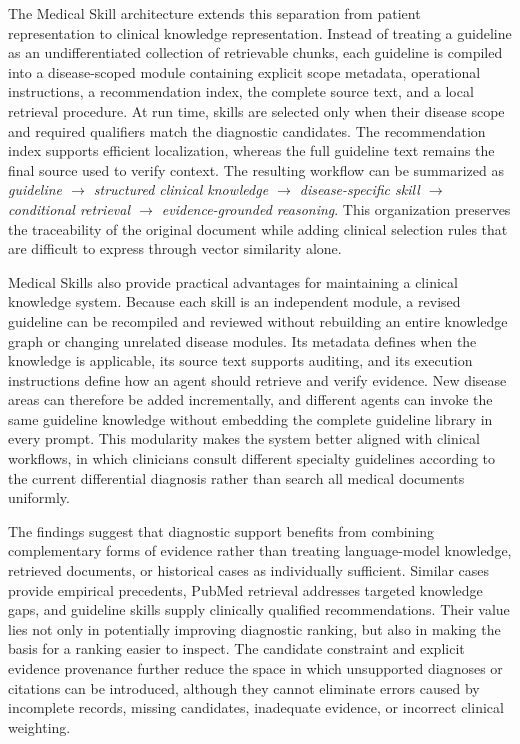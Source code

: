 \documentclass[10pt,letterpaper]{article}
\begin{document}
The Medical Skill architecture extends this separation from patient
representation to clinical knowledge representation. Instead of treating a
guideline as an undifferentiated collection of retrievable chunks, each
guideline is compiled into a disease-scoped module containing explicit scope
metadata, operational instructions, a recommendation index, the complete source
text, and a local retrieval procedure. At run time, skills are selected only
when their disease scope and required qualifiers match the diagnostic
candidates. The recommendation index supports efficient localization, whereas
the full guideline text remains the final source used to verify context. The
resulting workflow can be summarized as
\emph{guideline $\rightarrow$ structured clinical knowledge $\rightarrow$
disease-specific skill $\rightarrow$ conditional retrieval $\rightarrow$
evidence-grounded reasoning}. This organization preserves the traceability of
the original document while adding clinical selection rules that are difficult
to express through vector similarity alone.

Medical Skills also provide practical advantages for maintaining a clinical
knowledge system. Because each skill is an independent module, a revised
guideline can be recompiled and reviewed without rebuilding an entire knowledge
graph or changing unrelated disease modules. Its metadata defines when the
knowledge is applicable, its source text supports auditing, and its execution
instructions define how an agent should retrieve and verify evidence. New
disease areas can therefore be added incrementally, and different agents can
invoke the same guideline knowledge without embedding the complete guideline
library in every prompt. This modularity makes the system better aligned with
clinical workflows, in which clinicians consult different specialty guidelines
according to the current differential diagnosis rather than search all medical
documents uniformly.

The findings suggest that diagnostic support benefits from combining
complementary forms of evidence rather than treating language-model knowledge,
retrieved documents, or historical cases as individually sufficient. Similar
cases provide empirical precedents, PubMed retrieval addresses targeted
knowledge gaps, and guideline skills supply clinically qualified
recommendations. Their value lies not only in potentially improving diagnostic
ranking, but also in making the basis for a ranking easier to inspect. The
candidate constraint and explicit evidence provenance further reduce the space
in which unsupported diagnoses or citations can be introduced, although they
cannot eliminate errors caused by incomplete records, missing candidates,
inadequate evidence, or incorrect clinical weighting.
\end{document}
